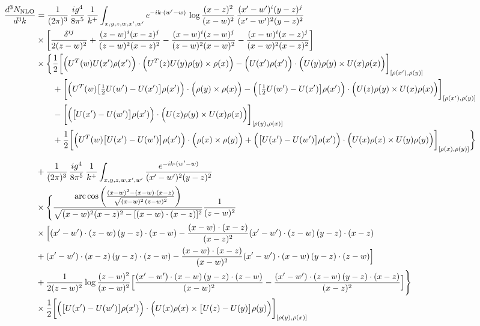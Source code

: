 \documentclass[10pt]{article}
\begin{document}
\begin{align}
\frac{d^{3}N_{\rm NLO}}{d^{3}k}&=\frac{1}{(2\pi)^{3}}\,\frac{ig^{4}}{8\pi^{5}}\,\frac{1}{k^{+}}\int_{x,y,z,w,x',w'}e^{-ik\cdot(w'-w)}\,\log\frac{(x-z)^{2}}{(x-w)^{2}}\,\frac{(x'-w')^{i}(y-z)^{j}}{(x'-w')^{2}(y-z)^{2}}\notag\\
&\times\bigg[\frac{\delta^{ij}}{2(z-w)^{2}}+\frac{(z-w)^{i}(x-z)^{j}}{(z-w)^{2}(x-z)^{2}}-\frac{(x-w)^{i}(z-w)^{j}}{(z-w)^{2}(x-w)^{2}}-\frac{(x-w)^{i}(x-z)^{j}}{(x-w)^{2}(x-z)^{2}}\bigg]\notag\\
&\times\bigg\{\frac12\bigg[\Big(U^{T}(w)U(x')\rho(x')\Big)\cdot\Big(U^{T}(z)U(y)\rho(y)\times\rho(x)\Big)-\Big(U(x')\rho(x')\Big)\cdot\Big(U(y)\rho(y)\times U(x)\rho(x)\Big)\bigg]_{[\rho(x'),\rho(y)]}\notag\\
&\qquad+\bigg[\Big(U^{T}(w)\big[\tfrac12U(w')-U(x')\big]\rho(x')\Big)\cdot\Big(\rho(y)\times\rho(x)\Big)-\Big(\big[\tfrac12U(w')-U(x')\big]\rho(x')\Big)\cdot\Big(U(z)\rho(y)\times U(x)\rho(x)\Big)\bigg]_{[\rho(x'),\rho(y)]}\notag\\
&\qquad-\bigg[\Big(\big[U(x')-U(w')\big]\rho(x')\Big)\cdot\Big(U(z)\rho(y)\times U(x)\rho(x)\Big)\bigg]_{[\rho(y),\rho(x)]}\notag\\
&\qquad+\frac12\bigg[\Big(U^{T}(w)\big[U(x')-U(w')\big]\rho(x')\Big)\cdot\Big(\rho(x)\times\rho(y)\Big)+\Big(\big[U(x')-U(w')\big]\rho(x')\Big)\cdot\Big(U(x)\rho(x)\times U(y)\rho(y)\Big)\bigg]_{[\rho(x),\rho(y)]}\bigg\}\notag\\[6pt]
&+\frac{1}{(2\pi)^{3}}\,\frac{ig^{4}}{8\pi^{5}}\,\frac{1}{k^{+}}\int_{x,y,z,w,x',w'}\frac{e^{-ik\cdot(w'-w)}}{(x'-w')^{2}(y-z)^{2}}\notag\\
&\times\Bigg\{\frac{\mathrm{arc\,cos}\left(\frac{(x-w)^{2}-(x-w)\cdot (x-z)}{\sqrt{(x-w)^{2}\,(z-w)^{2}}}\right)}{\sqrt{(x-w)^{2}(x-z)^{2}-[(x-w)\cdot(x-z)]^{2}}}\frac{1}{(z-w)^{2}}\notag\\
&\times\Big[(x'-w')\cdot(z-w)\,(y-z)\cdot(x-w)-\frac{(x-w)\cdot(x-z)}{(x-z)^{2}}(x'-w')\cdot(z-w)\,(y-z)\cdot(x-z)\notag\\
&+(x'-w')\cdot(x-z)\,(y-z)\cdot(z-w)-\frac{(x-w)\cdot(x-z)}{(x-w)^{2}}(x'-w')\cdot(x-w)\,(y-z)\cdot(z-w)\Big]\notag\\
&+\frac{1}{2(z-w)^{2}}\log\frac{(z-w)^{2}}{(x-w)^{2}}\Big[\frac{(x'-w')\cdot(x-w)\,(y-z)\cdot(z-w)}{(x-w)^{2}}-\frac{(x'-w')\cdot(z-w)\,(y-z)\cdot(x-z)}{(x-z)^{2}}\Big]\Bigg\}\notag\\
&\times\frac12\bigg[\Big(\big[U(x')-U(w')\big]\rho(x')\Big)\cdot\Big(U(x)\rho(x)\times\big[U(z)-U(y)\big]\rho(y)\Big)\bigg]_{[\rho(y),\rho(x)]}\notag\\[6pt]

\end{align}
\end{document}
